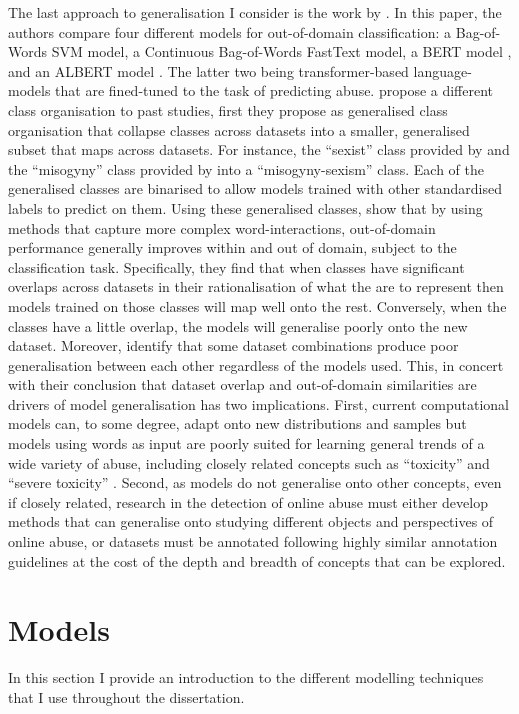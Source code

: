 The last approach to generalisation I consider is the work by \citet{Fortuna:2021}. In this paper, the authors compare four different models for out-of-domain classification: a Bag-of-Words SVM model, a Continuous Bag-of-Words FastText model, a BERT model \citep{Devlin:2019}, and an ALBERT model \cite{Lan:2020}. The latter two being transformer-based language-models that are fined-tuned to the task of predicting abuse.
\citet{Fortuna:2021} propose a different class organisation to past studies, first they propose as generalised class organisation that collapse classes across datasets into a smaller, generalised subset that maps across datasets. For instance, the ``sexist'' class provided by \citet{Waseem-Hovy:2016} and the ``misogyny'' class provided by \citet{Fersini:2018} into a ``misogyny-sexism'' class. Each of the generalised classes are binarised to allow models trained with other standardised labels to predict on them.
Using these generalised classes, \citet{Fortuna:2021} show that by using methods that capture more complex word-interactions, out-of-domain performance generally improves within and out of domain, subject to the classification task.
Specifically, they find that when classes have significant overlaps across datasets in their rationalisation of what the are to represent then models trained on those classes will map well onto the rest.
Conversely, when the classes have a little overlap, the models will generalise poorly onto the new dataset.
Moreover, \citet{Fortuna:2021} identify that some dataset combinations produce poor generalisation between each other regardless of the models used.
This, in concert with their conclusion that dataset overlap and out-of-domain similarities are drivers of model generalisation has two implications.
First, current computational models can, to some degree, adapt onto new distributions and samples but models using words as input are poorly suited for learning general trends of a wide variety of abuse, including closely related concepts such as ``toxicity'' and ``severe toxicity'' \citep{Fortuna:2021}.
Second, as models do not generalise onto other concepts, even if closely related, research in the detection of online abuse must either develop methods that can generalise onto studying different objects and perspectives of online abuse, or datasets must be annotated following highly similar annotation guidelines at the cost of the depth and breadth of concepts that can be explored.

\section{Models}\label{sec:model_background}
In this section I provide an introduction to the different modelling techniques that I use throughout the dissertation.

